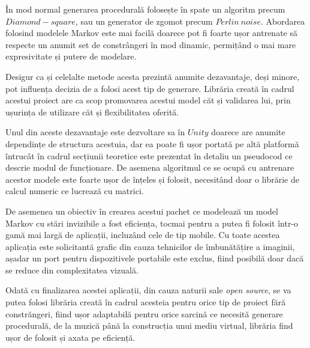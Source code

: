 În mod normal generarea procedurală folosește în spate un algoritm precum $Diamond-square$, sau un generator de zgomot precum $Perlin \ noise$. Abordarea folosind modelele Markov este mai facilă doarece pot fi foarte ușor antrenate să respecte un anumit set de constrângeri în mod dinamic, permițând o mai mare expresivitate și putere de modelare. \par

Desigur ca și celelalte metode acesta prezintă anumite dezavantaje, deși minore, pot influența decizia de a folosi acest tip de generare. Librăria creată în cadrul acestui proiect are ca scop promovarea acestui model căt și validarea lui, prin ușurința de utilizare căt și flexibilitatea oferită.\par

Unul din aceste dezavantaje este dezvoltare sa în $Unity$ doarece are anumite dependințe de structura acestuia, dar ea poate fi ușor portată pe altă platformă întrucât în cadrul secțiunii teoretice este prezentat în detaliu un pseudocod ce descrie modul de funcționare. De asemena algoritmul ce se ocupă cu antrenare acestor modele este foarte ușor de înțeles și folosit, necesitând doar o librărie de calcul numeric ce lucrează cu matrici.\par  

De asemenea un obiectiv în crearea acestui pachet ce modelează un model Markov cu stări invizibile a fost eficiența, tocmai pentru a putea fi folosit într-o gamă mai largă de aplicații, incluzând cele de tip mobile. Cu toate acestea aplicația este solicitantă grafic din cauza tehnicilor de îmbunătățire a imaginii, așadar un port pentru dispozitivele portabile este exclus, fiind posibilă doar dacă se reduce din complexitatea vizuală.\par

Odată cu finalizarea acestei aplicații, din cauza naturii sale \textit{open source}, se va putea folosi librăria creată în cadrul acesteia pentru orice tip de proiect fără constrăngeri, fiind ușor adaptabilă pentru orice sarcină ce necesită generare procedurală, de la muzică până la construcția unui mediu virtual, librăria find ușor de folosit și axata pe eficiență.\par
